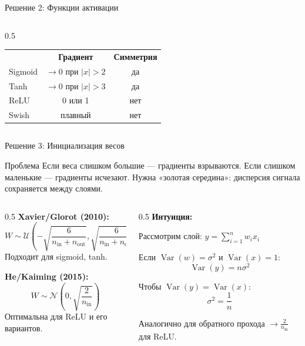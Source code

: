 \documentclass[aspectratio=169, 9pt]{beamer}
\begin{document}
\begin{frame}{Решение 2: Функции активации}
\begin{columns}[T]
\begin{column}{0.5\textwidth}
      \vspace{0.3em}
      \begin{center}
        \begin{tabular}{lcc}
          & \textbf{Градиент} & \textbf{Симметрия} \\
          Sigmoid & $\to 0$ при $|x|>2$ & да \\
          Tanh & $\to 0$ при $|x|>3$ & да \\
          ReLU & 0 или 1 & нет \\
          Swish & плавный & нет
        \end{tabular}
      \end{center}
    \end{column}
  \end{columns}
\end{frame}

\begin{frame}{Решение 3: Инициализация весов}
  \begin{block}{Проблема}
    Если веса слишком большие — градиенты взрываются.
    Если слишком маленькие — градиенты исчезают.
    Нужна «золотая середина»: дисперсия сигнала сохраняется между слоями.
  \end{block}
  
  \begin{columns}[T]
    \begin{column}{0.5\textwidth}
      \textbf{Xavier/Glorot (2010):}
      \[
      W \sim \mathcal{U}\left(-\sqrt{\frac{6}{n_{\text{in}} + n_{\text{out}}}}, \sqrt{\frac{6}{n_{\text{in}} + n_{\text{out}}}}\right)
      \]
      Подходит для sigmoid, tanh.
      
      \textbf{He/Kaiming (2015):}
      \[
      W \sim \mathcal{N}\left(0, \sqrt{\frac{2}{n_{\text{in}}}}\right)
      \]
      Оптимальна для ReLU и его вариантов.
    \end{column}
    \begin{column}{0.5\textwidth}
      \textbf{Интуиция:}
      
      Рассмотрим слой: $y = \sum_{i=1}^{n} w_i x_i$
      
      Если $\operatorname{Var}(w) = \sigma^2$ и $\operatorname{Var}(x) = 1$:
      \[
      \operatorname{Var}(y) = n \sigma^2
      \]
      
      Чтобы $\operatorname{Var}(y) = \operatorname{Var}(x)$:
      \[
      \sigma^2 = \frac{1}{n}
      \]
      
      Аналогично для обратного прохода $\to \frac{2}{n_{\text{in}}}$ для ReLU.
    \end{column}
  \end{columns}
\end{frame}
\end{document}
